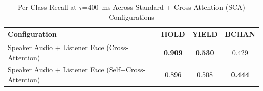 \begin{table}[h]
\caption{Per-Class Recall at $\tau$=400~ms Across Standard + Cross-Attention (SCA) Configurations}
\label{tab:recall_per_class_sca}
\small
\renewcommand{\arraystretch}{1.20}
\begin{tabular}{>{\raggedright\arraybackslash}p{4cm}ccc}
\toprule
Configuration & HOLD & YIELD & BCHAN \\
\midrule
Speaker Audio + Listener Face (Cross-Attention) & \textbf{0.909} & \textbf{0.530} & 0.429 \\
Speaker Audio + Listener Face (Self+Cross-Attention) & 0.896 & 0.508 & \textbf{0.444} \\
\bottomrule
\end{tabular}
\end{table}
